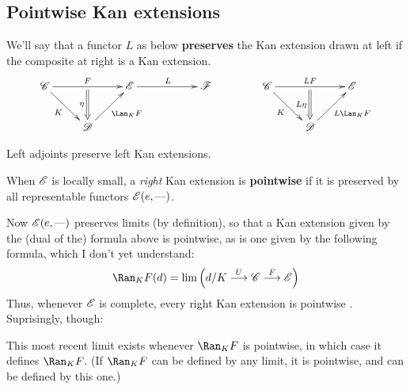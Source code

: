 \documentclass[11pt]{article}
\begin{document}
\subsection*{Pointwise Kan extensions}
We'll say that a functor $L$ as below \textbf{preserves} the Kan extension drawn at left if the composite at right is a Kan extension.
\[
\vcenter{\xymatrix{
\scrC\ar[rd]_-{K}\ar[rr]^-{F}_-{}="arF"&%
&%
\scrE\ar[rr]^L&&\scrF\\%
&%
\scrD\ar@{->}[ur]_{\Lan_KF}\ar@{=>}"arF";[]_-{\eta}&%
}}
\qquad \qquad 
\vcenter{\xymatrix{
\scrC\ar[rd]_-{K}\ar[rr]^-{LF}_-{}="arF"&%
&%
\scrE\\%
&%
\scrD\ar@{->}[ur]_{L\Lan_KF}\ar@{=>}"arF";[]_-{L\eta}&%
}}
\]
\begin{lem*}
Left adjoints preserve left Kan extensions.
\end{lem*}
\begin{defn*}
When $\mathscr{E}$ is locally small, a \textit{right} Kan extension is \textbf{pointwise} if it is preserved by all representable functors $\mathscr{E}(e,\textup{---} )$.
\end{defn*}
Now $\mathscr{E}(e,\textup{---} )$ preserves limits (by definition), so that a Kan extension given by the (dual of the) formula above is pointwise, as is one given by the following formula, which I don't yet understand:
\[\Ran_KF(d)=\lim\left(d/K\overset{U}{\to}\scrC\overset{F}{\to}\scrE\right)\]
Thus, whenever $\mathscr{E}$ is complete, every right Kan extension is pointwise .
Suprisingly, though:
\begin{thm*}
This most recent limit exists whenever $\Ran_KF$ is pointwise, in which case it defines $\Ran_KF$. (If $\Ran_KF$ can be defined by any limit, it is pointwise, and can be defined by this one.)
\end{thm*}
\end{document}
